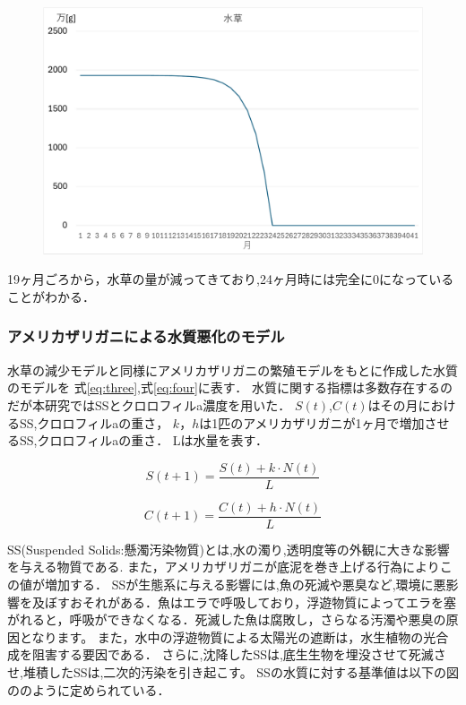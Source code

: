 \documentclass[12pt,a4j,titlepage]{ltjsarticle}
\begin{document}
{{\begin{figure}[h]
 \begin{center}
   \includegraphics[width=.95\columnwidth]{mizukusa_graph.pdf}
 \end{center}
 \end{figure}

19ヶ月ごろから，水草の量が減ってきており,24ヶ月時には完全に0になっていることがわかる．

\subsubsection{アメリカザリガニによる水質悪化のモデル}
水草の減少モデルと同様にアメリカザリガニの繁殖モデルをもとに作成した水質のモデルを
式\eqref{eq:three},式\eqref{eq:four}に表す．
水質に関する指標は多数存在するのだが本研究ではSSとクロロフィルa濃度を用いた．
$S(t)$,$C(t)$はその月におけるSS,クロロフィルaの重さ，
$k$，$h$は1匹のアメリカザリガニが1ヶ月で増加させるSS,クロロフィルaの重さ．
Lは水量を表す．

\begin{equation}
  S(t+1) = \frac{S(t) + k \cdot N(t)}{L}\label{eq:three}
\end{equation}

\begin{equation}
  C(t+1) = \frac{C(t) + h \cdot N(t)}{L}\label{eq:four}
\end{equation}

SS(Suspended Solids:懸濁汚染物質)とは,水の濁り,透明度等の外観に大きな影響を与える物質である.
また，アメリカザリガニが底泥を巻き上げる行為によりこの値が増加する．
SSが生態系に与える影響には,魚の死滅や悪臭など,環境に悪影響を及ぼすおそれがある．魚はエラで呼吸しており，浮遊物質によってエラを塞がれると，呼吸ができなくなる．死滅した魚は腐敗し，さらなる汚濁や悪臭の原因となります。
また，水中の浮遊物質による太陽光の遮断は，水生植物の光合成を阻害する要因である．
さらに,沈降したSSは,底生生物を埋没させて死滅させ,堆積したSSは,二次的汚染を引き起こす。
SSの水質に対する基準値は以下の図ののように定められている．

}}
\end{document}

